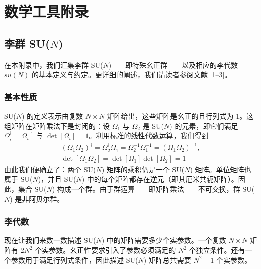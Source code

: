 
\chapter{数学工具附录}

\section{李群 SU($N$)}

在本附录中，我们汇集李群 SU($N$)——即特殊幺正群——以及相应的李代数 $su(N)$ 的基本定义与约定。更详细的阐述，我们请读者参阅文献 [1--3]。

\subsection{基本性质}

SU($N$) 的定义表示由复数 $N\times N$ 矩阵给出，这些矩阵是幺正的且行列式为 1。这组矩阵在矩阵乘法下是封闭的：设 $\Omega_1$ 与 $\Omega_2$ 是 SU($N$) 的元素，即它们满足 $\Omega_i^\dagger = \Omega_i^{-1}$ 与 $\det[\Omega_i] = 1$。利用标准的线性代数运算，我们得到
\begin{equation}
  \begin{gathered}
    (\Omega_1\Omega_2)^\dagger = \Omega_2^\dagger\Omega_1^\dagger
    = \Omega_2^{-1}\Omega_1^{-1} = (\Omega_1\Omega_2)^{-1},\\[2pt]
    \det[\Omega_1\Omega_2] = \det[\Omega_1]\det[\Omega_2] = 1
  \end{gathered}
\end{equation}
由此我们便确立了：两个 SU($N$) 矩阵的乘积仍是一个 SU($N$) 矩阵。单位矩阵也属于 SU($N$)，并且 SU($N$) 中的每个矩阵都存在逆元（即其厄米共轭矩阵）。因此，集合 SU($N$) 构成一个群。由于群运算——即矩阵乘法——不可交换，群 SU($N$) 是非阿贝尔群。

\subsection{李代数}

现在让我们来数一数描述 SU($N$) 中的矩阵需要多少个实参数。一个复数 $N\times N$ 矩阵有 $2N^2$ 个实参数。幺正性要求引入了参数必须满足的 $N^2$ 个独立条件。还有一个参数用于满足行列式条件，因此描述 SU($N$) 矩阵总共需要 $N^2-1$ 个实参数。

